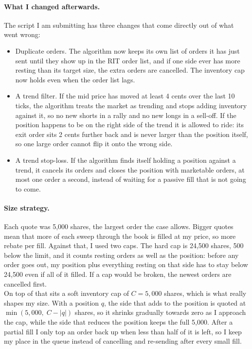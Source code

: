 \documentclass{article}
\begin{document}
\paragraph{What I changed afterwards.}
The script I am submitting has three changes that come directly out of what went wrong:
\begin{itemize}
  \item Duplicate orders. The algorithm now keeps its own list of orders it has just sent until they show up in the RIT order list, and if one side ever has more resting than its target size, the extra orders are cancelled. The inventory cap now holds even when the order list lags.
  \item A trend filter. If the mid price has moved at least 4 cents over the last 10 ticks, the algorithm treats the market as trending and stops adding inventory against it, so no new shorts in a rally and no new longs in a sell-off. If the position happens to be on the right side of the trend it is allowed to ride: its exit order sits 2 cents further back and is never larger than the position itself, so one large order cannot flip it onto the wrong side.
  \item A trend stop-loss. If the algorithm finds itself holding a position against a trend, it cancels its orders and closes the position with marketable orders, at most one order a second, instead of waiting for a passive fill that is not going to come.
\end{itemize}

\paragraph{Size strategy.}
Each quote was 5{,}000 shares, the largest order the case allows. Bigger quotes mean that more of each sweep through the book is filled at my price, so more rebate per fill. Against that, I used two caps. The hard cap is 24{,}500 shares, 500 below the limit, and it counts resting orders as well as the position: before any order goes out, my position plus everything resting on that side has to stay below 24{,}500 even if all of it filled. If a cap would be broken, the newest orders are cancelled first.\\

\noindent On top of that sits a soft inventory cap of $C = 5{,}000$ shares, which is what really shapes my size. With a position $q$, the side that adds to the position is quoted at $\min(5{,}000,\; C - |q|)$ shares, so it shrinks gradually towards zero as I approach the cap, while the side that reduces the position keeps the full 5{,}000. After a partial fill I only top an order back up when less than half of it is left, so I keep my place in the queue instead of cancelling and re-sending after every small fill.\\
\end{document}
